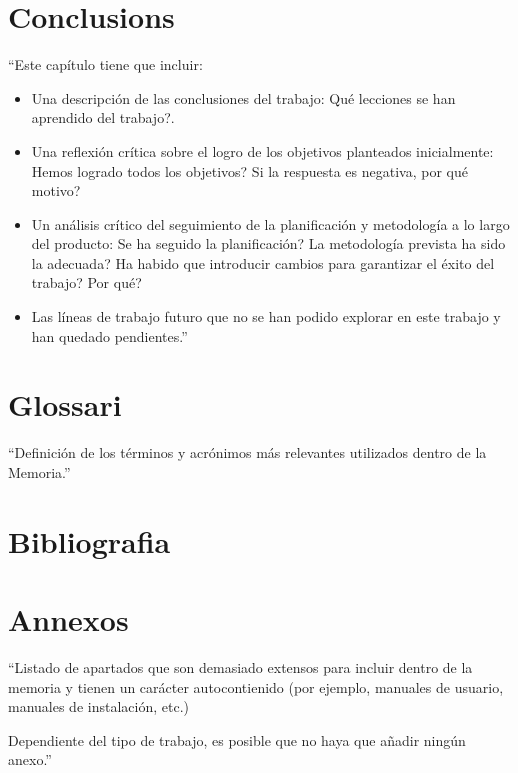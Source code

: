 \documentclass[11pt,a4paper]{article}
\begin{document}
\section{Conclusions}
``Este capítulo tiene que incluir:
\begin{itemize}
\item Una descripción de las conclusiones del trabajo: Qué lecciones se han aprendido del trabajo?.
\item Una reflexión crítica sobre el logro de los objetivos planteados inicialmente: Hemos logrado todos los objetivos? Si la respuesta es negativa, por qué motivo? 
\item Un análisis crítico del seguimiento de la planificación y metodología a lo largo del producto: Se ha seguido la planificación? La metodología prevista ha sido la adecuada? Ha habido que introducir cambios para garantizar el éxito del trabajo? Por qué? 
\item Las líneas de trabajo futuro que no se han podido explorar en este trabajo y han quedado pendientes.''
\end{itemize}
\newpage 


\section{Glossari}
``Definición de los términos y acrónimos más relevantes utilizados dentro de la Memoria.''
\newpage 


\section{Bibliografia}



\newpage 


\section{Annexos}
``Listado de apartados que son demasiado extensos para incluir dentro de la memoria y tienen un carácter autocontienido (por ejemplo, manuales de usuario, manuales de instalación, etc.) 

Dependiente del tipo de trabajo, es posible que no haya que añadir ningún anexo.''
\end{document}
